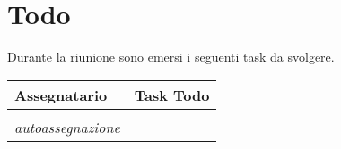 \section{Todo}
Durante la riunione sono emersi i seguenti task da svolgere.

\begin{center}
  \begin{tabular}{|p{5cm}|p{8cm}|}
    \hline
    \textbf{Assegnatario}       & \textbf{Task Todo} \\ \hline
        &   \\ \hline
    \textit{autoassegnazione}   &   \\ \hline
  \end{tabular}
\end{center}